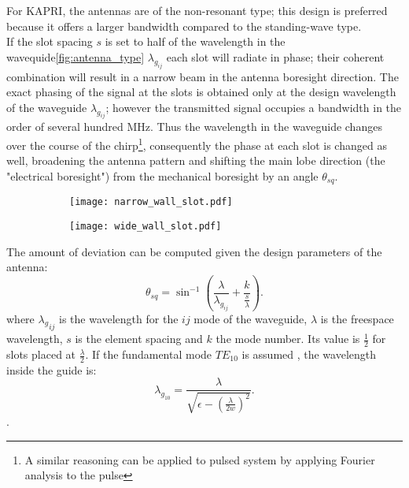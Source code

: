 For KAPRI, the antennas are of the non-resonant type; this design is preferred because it offers a larger bandwidth compared to the standing-wave type.\\
If the slot spacing $s$ is set to  half of the wavelength in the wavequide\autoref{fig:antenna_type} $\lambda_{g_{ij}}$\cite{kraus88} each slot will radiate in phase; their coherent combination will result in a narrow beam in the antenna boresight direction. The exact phasing of the signal at the slots is obtained only at the design wavelength of the waveguide $\lambda_{g_{ij}}$; however the transmitted signal occupies a bandwidth in the order of several hundred MHz. Thus the wavelength in the waveguide changes over the course of the chirp\footnote{A similar reasoning can be applied to pulsed system by applying Fourier analysis to the pulse\cite{Sarkar1989}}, consequently the phase at each slot is changed as well, broadening the antenna pattern and shifting the main lobe direction (the "electrical boresight") from the mechanical boresight by an angle $\theta_{sq}$.\\
\begin{figure}[ht]
	\begin{subfigure}{\columnwidth}
		\texttt{[image: narrow\_wall\_slot.pdf]}
	\end{subfigure}
	\begin{subfigure}{\columnwidth}
		\texttt{[image: wide\_wall\_slot.pdf]}
	\end{subfigure}
	\label{fig:antenna_type}
\end{figure}
The amount of deviation can be computed given the design parameters of the antenna:
\begin{equation}\label{eq:squint_exact}
	\theta_{sq} = \sin^{-1}\left({\frac{\lambda}{\lambda_{g_{ij}}} + \frac{k}{\frac{s}{\lambda}}}\right).
\end{equation}
where ${\lambda_g}_{ij}$ is the wavelength for the $ij$ mode of the waveguide, $\lambda$ is the freespace wavelength, $s$ is the element spacing and $k$ the mode number. Its value is $\frac{1}{2}$ for slots placed at $\frac{\lambda}{2}$.
If the fundamental mode $TE_{10}$ is assumed , the wavelength inside the guide is:
\begin{equation}
\lambda_{g_{10}} = \frac{\lambda}{\sqrt{\epsilon - \left(\frac{\lambda}{2w}\right)^2 }}.
\end{equation}.\\
